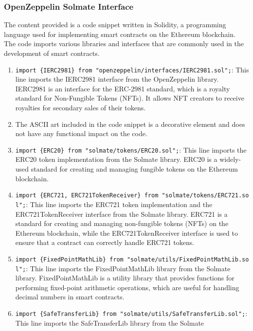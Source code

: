 \hypertarget{openzeppelin-solmate-interface-1}{%
\subsubsection{OpenZeppelin Solmate
Interface}\label{openzeppelin-solmate-interface-1}}

The content provided is a code snippet written in Solidity, a
programming language used for implementing smart contracts on the
Ethereum blockchain. The code imports various libraries and interfaces
that are commonly used in the development of smart contracts.

\begin{enumerate}
\def\labelenumi{\arabic{enumi}.}
\item
  \texttt{import\ \{IERC2981\}\ from\ "openzeppelin/interfaces/IERC2981.sol";}:
  This line imports the IERC2981 interface from the OpenZeppelin
  library. IERC2981 is an interface for the ERC-2981 standard, which is
  a royalty standard for Non-Fungible Tokens (NFTs). It allows NFT
  creators to receive royalties for secondary sales of their tokens.
\item
  The ASCII art included in the code snippet is a decorative element and
  does not have any functional impact on the code.
\item
  \texttt{import\ \{ERC20\}\ from\ "solmate/tokens/ERC20.sol";}: This
  line imports the ERC20 token implementation from the Solmate library.
  ERC20 is a widely-used standard for creating and managing fungible
  tokens on the Ethereum blockchain.
\item
  \texttt{import\ \{ERC721,\ ERC721TokenReceiver\}\ from\ "solmate/tokens/ERC721.sol";}:
  This line imports the ERC721 token implementation and the
  ERC721TokenReceiver interface from the Solmate library. ERC721 is a
  standard for creating and managing non-fungible tokens (NFTs) on the
  Ethereum blockchain, while the ERC721TokenReceiver interface is used
  to ensure that a contract can correctly handle ERC721 tokens.
\item
  \texttt{import\ \{FixedPointMathLib\}\ from\ "solmate/utils/FixedPointMathLib.sol";}:
  This line imports the FixedPointMathLib library from the Solmate
  library. FixedPointMathLib is a utility library that provides
  functions for performing fixed-point arithmetic operations, which are
  useful for handling decimal numbers in smart contracts.
\item
  \texttt{import\ \{SafeTransferLib\}\ from\ "solmate/utils/SafeTransferLib.sol";}:
  This line imports the SafeTransferLib library from the Solmate

\end{enumerate}
